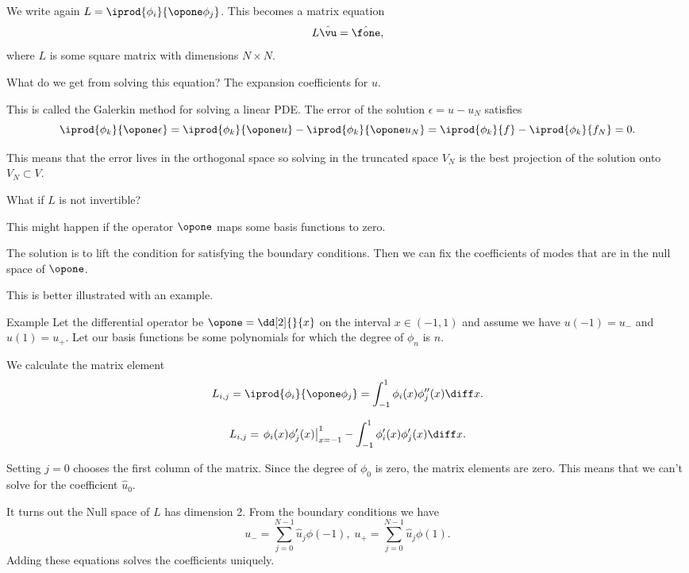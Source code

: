 \begin{frame}
	We write again $ L = \iprod{\phi_i}{\opone \phi_j}  $. This becomes a matrix equation
	\[ L \hat{\vu} = \hat{\fone}, \]
	where $ L $ is some square matrix with dimensions $ N\times N $. 
	
	\pause
	What do we get from solving this equation? \pause The expansion coefficients for $ u $. 
	
	\pause
	This is called the \alert{Galerkin method} for solving a linear PDE. The error of the solution $ \epsilon = u - u_N $ satisfies
	\[ \iprod{\phi_k}{\opone\epsilon } = \iprod{\phi_k}{\opone u } - \iprod{\phi_k}{\opone  u_N}
	= \iprod{\phi_k}{f} - \iprod{\phi_k}{f_N} = 0.
	\]
	
	\pause
	This means that the error lives in the orthogonal space so solving in the truncated space $ V_N $ is the best projection of the solution onto $ V_N \subset V $.
\end{frame}

\begin{frame}
	What if $ L $ is not invertible?
	
	\pause
	This might happen if the operator $ \opone $ maps some basis functions to zero.

	\pause
	The solution is to lift the condition for satisfying the boundary conditions. Then we can fix the coefficients of modes that are in the null space of $ \opone $.
	
	\pause
	This is better illustrated with an example.
\end{frame}

\begin{frame}{Example}
	Let the differential operator be $ \opone = \dd[2]{}{x} $ on the interval $ x \in (-1,1) $ and assume we have $ u(-1) = u_- $ and $ u(1) = u_+ $. Let our basis functions be some polynomials for which the degree of $ \phi_n $ is $ n $. 
	
	\pause
	We calculate the matrix element
	\[ L_{i,j} =  \iprod{\phi_i}{\opone \phi_j}  = \int_{-1}^{1} \phi_i(x) \phi_j''(x) \diff x.     \]
	
	\pause
	\[ L_{i,j}  = \left.\phi_i(x) \phi_j'(x)  \right| _{x=-1}^{1} 
	-\int_{-1}^{1} \phi_i' (x) \phi_j'(x) \diff x.   \]
	
	\pause
	Setting $ j=0 $ chooses the first column of the matrix. Since the degree of $ \phi_0 $ is zero, the matrix elements are zero. This means that we can't solve for the coefficient $ \hat{u}_0 $. 
	
	\pause
	It turns out the Null space of $ L $ has dimension 2. From the boundary conditions we have
	\[ u_- = \sum_{j=0}^{N-1} \hat{u}_j \phi(-1), \; u_+ = \sum_{j=0}^{N-1} \hat{u}_j \phi(1). \]
	Adding these equations solves the coefficients uniquely. 
\end{frame}


